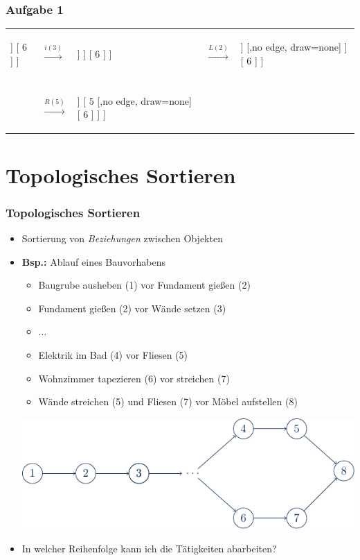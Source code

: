 \documentclass{beamer}
\begin{document}
\begin{frame} \frametitle{Aufgabe 1}
	\small
	\begin{tabularx}{\linewidth}{m{2cm} m{.5cm} m{2.5cm} m{.5cm} m{2cm}}
		\begin{forest}
			[ $5$ [ $2$ [ $1$ ] [ $4$ ] ] [ $6$ ] ]
		\end{forest} 
		&
		$\overset{i(3)}{\longrightarrow}$
		&
		\begin{forest}
			[ $5^{-2}$ [ $2^{1}$ [ $1$ ] [ $4^{-1}$ [ $3^0$ ] [,no edge, draw=none]] ] [ $6$ ] ]
		\end{forest} 
		&
		$\overset{L(2)}{\longrightarrow}$
		&
		\begin{forest}
			[ $5$ [ $4$ [ $2$ [ $1$ ] [ $3$ ] ] [,no edge, draw=none] ] [ $6$ ] ]
		\end{forest}  \\ \\
		& $\overset{R(5)}{\longrightarrow}$
		& 
		\begin{forest}
			[ $4$ [ $2$ [ $1$ ] [ $3$ ]] [ $5$ [,no edge, draw=none] [ $6$ ] ] ]
		\end{forest}
	\end{tabularx}
\end{frame}


\section{Topologisches Sortieren}

\begin{frame} \frametitle{Topologisches Sortieren}
	\begin{itemize}
		\item Sortierung von \textit{Beziehungen} zwischen Objekten
		\item \textbf{Bsp.:} Ablauf eines Bauvorhabens \pause
		\begin{itemize}
			\item Baugrube ausheben (1) vor Fundament gießen (2)
			\item Fundament gießen (2) vor Wände setzen (3)
			\item $\dots$
			\item Elektrik im Bad (4) vor Fliesen (5)
			\item Wohnzimmer tapezieren (6) vor streichen (7)
			\item Wände streichen (5) und Fliesen (7) vor Möbel aufstellen (8)
		\end{itemize}
		\pause
		\begin{center}
			\includegraphics[width=0.7\linewidth]{tut10-topsort-bsp}
		\end{center}
		\pause
		\item In welcher Reihenfolge kann ich die Tätigkeiten abarbeiten?
	\end{itemize}
\end{frame}
\end{document}
